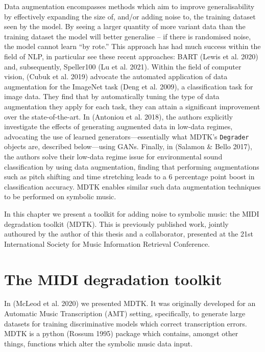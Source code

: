 \documentclass[12pt,a4paper,]{report}
\begin{document}
Data augmentation encompasses methods which aim to improve
generalisability by effectively expanding the size of, and/or adding
noise to, the training dataset seen by the model. By seeing a larger
quantity of more variant data than the training dataset the model will
better generalise -- if there is randomised noise, the model cannot
learn ``by rote.'' This approach has had much success within the field
of NLP, in particular see these recent approaches: BART (Lewis et al.
2020) and, subsequently, Speller100 (Lu et al. 2021). Within the field
of computer vision, (Cubuk et al. 2019) advocate the automated
application of data augmentation for the ImageNet task (Deng et al.
2009), a classification task for image data. They find that by
automatically tuning the type of data augmentation they apply for each
task, they can attain a significant improvement over the
state-of-the-art. In (Antoniou et al. 2018), the authors explicitly
investigate the effects of generating augmented data in low-data
regimes, advocating the use of learned generators---essentially what
MDTK's \texttt{Degrader} objects are, described below---using GANs.
Finally, in (Salamon \& Bello 2017), the authors solve their low-data
regime issue for environmental sound classification by using data
augmentation, finding that performing augmentations such as pitch
shifting and time stretching leads to a 6 percentage point boost in
classification accuracy. MDTK enables similar such data augmentation
techniques to be performed on symbolic music.

In this chapter we present a toolkit for adding noise to symbolic music:
the MIDI degradation toolkit (MDTK). This is previously published work,
jointly authoured by the author of this thesis and a collaborator,
presented at the 21st International Society for Music Information
Retrieval Conference.

\hypertarget{the-midi-degradation-toolkit}{%
\section{The MIDI degradation
toolkit}\label{the-midi-degradation-toolkit}}

In (McLeod et al. 2020) we presented MDTK. It was originally developed
for an Automatic Music Transcription (AMT) setting, specifically, to
generate large datasets for training discriminative models which correct
transcription errors. MDTK is a python (Rossum 1995) package which
contains, amongst other things, functions which alter the symbolic music
data input.
\end{document}
